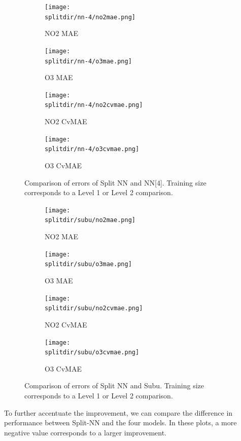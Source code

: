\documentclass[journal abbreviation, manuscript]{copernicus}
\begin{document}
\begin{figure}[H]
\begin{subfigure}{0.49\textwidth}
\texttt{[image: \\splitdir/nn-4/no2mae.png]}
\caption{NO2 MAE}
\end{subfigure}
\begin{subfigure}{0.49\textwidth}
\texttt{[image: \\splitdir/nn-4/o3mae.png]}
\caption{O3 MAE}
\end{subfigure}
\begin{subfigure}{0.49\textwidth}
\texttt{[image: \\splitdir/nn-4/no2cvmae.png]}
\caption{NO2 CvMAE}
\end{subfigure}
\begin{subfigure}{0.49\textwidth}
\texttt{[image: \\splitdir/nn-4/o3cvmae.png]}
\caption{O3 CvMAE}
\end{subfigure}
\caption{Comparison of errors of Split NN and NN[4]. Training size corresponds to a Level 1 or Level 2 comparison.}
\end{figure}

\begin{figure}[H]
\begin{subfigure}{0.49\textwidth}
\texttt{[image: \\splitdir/subu/no2mae.png]}
\caption{NO2 MAE}
\end{subfigure}
\begin{subfigure}{0.49\textwidth}
\texttt{[image: \\splitdir/subu/o3mae.png]}
\caption{O3 MAE}
\end{subfigure}
\begin{subfigure}{0.49\textwidth}
\texttt{[image: \\splitdir/subu/no2cvmae.png]}
\caption{NO2 CvMAE}
\end{subfigure}
\begin{subfigure}{0.49\textwidth}
\texttt{[image: \\splitdir/subu/o3cvmae.png]}
\caption{O3 CvMAE}
\end{subfigure}
\caption{Comparison of errors of Split NN and Subu. Training size corresponds to a Level 1 or Level 2 comparison.}
\end{figure}

To further accentuate the improvement, we can compare
the difference in performance between Split-NN and the four models. In these plots, a more negative value corresponds to a larger improvement.
\end{document}
